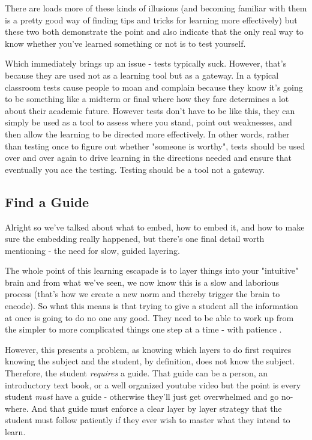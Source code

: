 \documentclass[11pt,a5paper]{book}
\begin{document}
There are loads more of these kinds of illusions (and becoming familiar with them is a pretty good way of finding tips and tricks for learning more effectively) but these two both demonstrate the point and also indicate that the only real way to know whether you've learned something or not is to test yourself. 
\newline

Which immediately brings up an issue - tests typically suck. However, that's because they are used not as a learning tool but as a gateway. In a typical classroom tests cause people to moan and complain because they know it's going to be something like a midterm or final where how they fare determines a lot about their academic future. However tests don't have to be like this, they can simply be used as a tool to assess where you stand, point out weaknesses, and then allow the learning to be directed more effectively. In other words, rather than testing once to figure out whether "someone is worthy", tests should be used over and over again to drive learning in the directions needed and ensure that eventually you ace the testing. Testing should be a tool not a gateway.

\subsection{Find a Guide}
Alright so we've talked about what to embed, how to embed it, and how to make sure the embedding really happened, but there's one final detail worth mentioning - the need for slow, guided layering. 
\newline

The whole point of this learning escapade is to layer things into your "intuitive" brain and from what we've seen, we now know this is a slow and laborious process (that's how we create a new norm and thereby trigger the brain to encode). So what this means is that trying to give a student all the information at once is going to do no one any good. They need to be able to work up from the simpler to more complicated things one step at a time - with patience \cite{ericsson}. 
\newline

However, this presents a problem, as knowing which layers to do first requires knowing the subject and the student, by definition, does not know the subject. Therefore, the student \textit{requires} a guide. That guide can be a person, an introductory text book, or a well organized youtube video but the point is every student \textit{must} have a guide - otherwise they'll just get overwhelmed and go no-where. And that guide must enforce a clear layer by layer strategy that the student must follow patiently if they ever wish to master what they intend to learn. 
\newline
\end{document}
